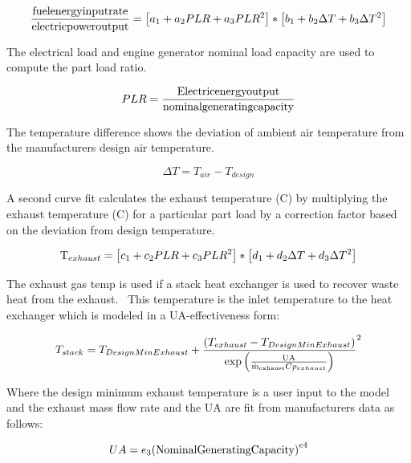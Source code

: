 \begin{equation}
\frac{{{\rm{fuel energy input rate}}}}{{{\rm{electric power output}}}} = \left[ {{a_1} + {a_2}PLR + {a_3}PL{R^2}} \right] * \left[ {{b_1} + {b_2}\Delta T + {b_3}\Delta {T^2}} \right]
\end{equation}

The electrical load and engine generator nominal load capacity are used to compute the part load ratio.

\begin{equation}
PLR = \frac{{{\rm{Electric energy output}}}}{{{\rm{nominal generating capacity}}}}
\end{equation}

The temperature difference shows the deviation of ambient air temperature from the manufacturers design air temperature.

\begin{equation}
\Delta T = {T_{air}} - {T_{design}}
\end{equation}

A second curve fit calculates the exhaust temperature (C) by multiplying the exhaust temperature (C) for a particular part load by a correction factor based on the deviation from design temperature.

\begin{equation}
{{\rm{T}}_{exhaust}} = \left[ {{c_1} + {c_2}PLR + {c_3}PL{R^2}} \right] * \left[ {{d_1} + {d_2}\Delta T + {d_3}\Delta {T^2}} \right]
\end{equation}

The exhaust gas temp is used if a stack heat exchanger is used to recover waste heat from the exhaust.~ This temperature is the inlet temperature to the heat exchanger which is modeled in a UA-effectiveness form:

\begin{equation}
{T_{stack}} = {T_{DesignMinExhaust}} + {\frac{{\left( {{T_{exhaust}} - {T_{DesignMinExhaust}}} \right)}}{{{\rm{exp}}\left( {\frac{{{\rm{UA}}}}{{{{{\rm{\dot m}}}_{{\rm{exhaust}}}}C{p_{exhaust}}}}} \right)}}^2}
\end{equation}

Where the design minimum exhaust temperature is a user input to the model and the exhaust mass flow rate and the UA are fit from manufacturers data as follows:

\begin{equation}
UA = {e_3}{{\rm{(Nominal Generating Capacity)}}^{e4}}
\end{equation}

